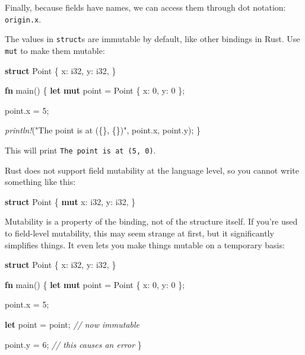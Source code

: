 \documentclass[a4paper,]{book}
\newenvironment{Shaded}{\begin{snugshade}}{\end{snugshade}}
\newcommand{\KeywordTok}[1]{\textcolor[rgb]{0.13,0.29,0.53}{\textbf{{#1}}}}
\newcommand{\DataTypeTok}[1]{\textcolor[rgb]{0.13,0.29,0.53}{{#1}}}
\newcommand{\DecValTok}[1]{\textcolor[rgb]{0.00,0.00,0.81}{{#1}}}
\newcommand{\StringTok}[1]{\textcolor[rgb]{0.31,0.60,0.02}{{#1}}}
\newcommand{\CommentTok}[1]{\textcolor[rgb]{0.56,0.35,0.01}{\textit{{#1}}}}
\newcommand{\PreprocessorTok}[1]{\textcolor[rgb]{0.56,0.35,0.01}{\textit{{#1}}}}
\newcommand{\NormalTok}[1]{{#1}}
\begin{document}
Finally, because fields have names, we can access them through dot
notation: \texttt{origin.x}.

The values in \texttt{struct}s are immutable by default, like other
bindings in Rust. Use \texttt{mut} to make them mutable:

\begin{Shaded}
\begin{Highlighting}[]
\KeywordTok{struct} \NormalTok{Point \{}
    \NormalTok{x: }\DataTypeTok{i32}\NormalTok{,}
    \NormalTok{y: }\DataTypeTok{i32}\NormalTok{,}
\NormalTok{\}}

\KeywordTok{fn} \NormalTok{main() \{}
    \KeywordTok{let} \KeywordTok{mut} \NormalTok{point = Point \{ x: }\DecValTok{0}\NormalTok{, y: }\DecValTok{0} \NormalTok{\};}

    \NormalTok{point.x = }\DecValTok{5}\NormalTok{;}

    \PreprocessorTok{println!}\NormalTok{(}\StringTok{"The point is at (\{\}, \{\})"}\NormalTok{, point.x, point.y);}
\NormalTok{\}}
\end{Highlighting}
\end{Shaded}

This will print \texttt{The\ point\ is\ at\ (5,\ 0)}.

Rust does not support field mutability at the language level, so you
cannot write something like this:

\begin{Shaded}
\begin{Highlighting}[]
\KeywordTok{struct} \NormalTok{Point \{}
    \KeywordTok{mut} \NormalTok{x: }\DataTypeTok{i32}\NormalTok{,}
    \NormalTok{y: }\DataTypeTok{i32}\NormalTok{,}
\NormalTok{\}}
\end{Highlighting}
\end{Shaded}

Mutability is a property of the binding, not of the structure itself. If
you're used to field-level mutability, this may seem strange at first,
but it significantly simplifies things. It even lets you make things
mutable on a temporary basis:

\begin{Shaded}
\begin{Highlighting}[]
\KeywordTok{struct} \NormalTok{Point \{}
    \NormalTok{x: }\DataTypeTok{i32}\NormalTok{,}
    \NormalTok{y: }\DataTypeTok{i32}\NormalTok{,}
\NormalTok{\}}

\KeywordTok{fn} \NormalTok{main() \{}
    \KeywordTok{let} \KeywordTok{mut} \NormalTok{point = Point \{ x: }\DecValTok{0}\NormalTok{, y: }\DecValTok{0} \NormalTok{\};}

    \NormalTok{point.x = }\DecValTok{5}\NormalTok{;}

    \KeywordTok{let} \NormalTok{point = point; }\CommentTok{// now immutable}

    \NormalTok{point.y = }\DecValTok{6}\NormalTok{; }\CommentTok{// this causes an error}
\NormalTok{\}}
\end{Highlighting}
\end{Shaded}
\end{document}
